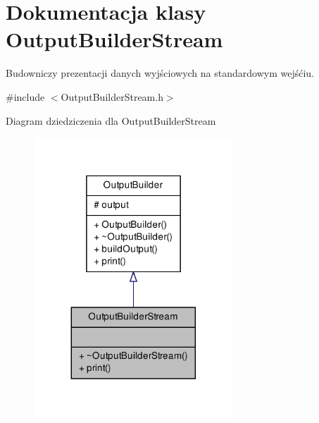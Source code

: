 \hypertarget{class_output_builder_stream}{\section{\-Dokumentacja klasy \-Output\-Builder\-Stream}
\label{class_output_builder_stream}
}


\-Budowniczy prezentacji danych wyjściowych na standardowym wejśćiu.  




{\ttfamily \#include $<$\-Output\-Builder\-Stream.\-h$>$}



\-Diagram dziedziczenia dla \-Output\-Builder\-Stream\nopagebreak
\begin{figure}[H]
\begin{center}
\leavevmode
\includegraphics[width=212pt]{class_output_builder_stream__inherit__graph}
\end{center}
\end{figure}


